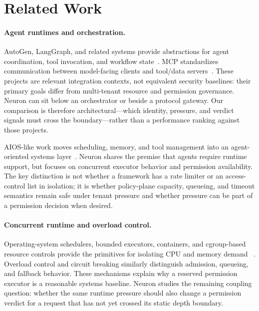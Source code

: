 \section{Related Work}
\label{sec:rw}
\label{sec:rw-sec}

\paragraph{Agent runtimes and orchestration.}
AutoGen, LangGraph, and related systems provide abstractions for agent
coordination, tool invocation, and workflow state~\cite{wu2023autogen,langgraph2024}.
MCP standardizes communication between model-facing clients and tool/data
servers~\cite{anthropic2024mcp}. These projects are relevant integration
contexts, not equivalent security baselines: their primary goals differ
from multi-tenant resource and permission governance. Neuron can sit below
an orchestrator or beside a protocol gateway. Our comparison is therefore
architectural---which identity, pressure, and verdict signals must cross the
boundary---rather than a performance ranking against those projects.

AIOS-like work moves scheduling, memory, and tool management into an
agent-oriented systems layer~\cite{mei2025aios}. Neuron shares the premise
that agents require runtime support, but focuses on concurrent executor
behavior and permission availability. The key distinction is not whether a
framework has a rate limiter or an access-control list in isolation; it is
whether policy-plane capacity, queueing, and timeout semantics remain safe
under tenant pressure and whether pressure can be part of a permission
decision when desired.

\paragraph{Concurrent runtime and overload control.}
Operating-system schedulers, bounded executors, containers, and cgroup-based
resource controls provide the primitives for isolating CPU and memory demand
~\cite{klein2009sel4,linux2024cgroupv2,young2023gvisor}. Overload control and
circuit breaking similarly distinguish admission, queueing, and fallback
behavior. These mechanisms explain why a reserved permission executor is a
reasonable systems baseline. Neuron studies the remaining coupling question:
whether the same runtime pressure should also change a permission verdict for
a request that has not yet crossed its static depth boundary.

